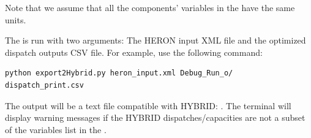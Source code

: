 \begin{enumerate}
Note that we assume that all the components' variables in the  have the same units.

 The  is run with two arguments: The HERON input XML file and the optimized dispatch outputs CSV file. For example, use the following command:

 \begin{lstlisting}
python export2Hybrid.py heron_input.xml Debug_Run_o/
dispatch_print.csv
 \end{lstlisting}

The output will be a text file compatible with HYBRID:    . The terminal will display warning messages if the HYBRID dispatches/capacities are not a subset of the variables list in the .

\end{enumerate}
